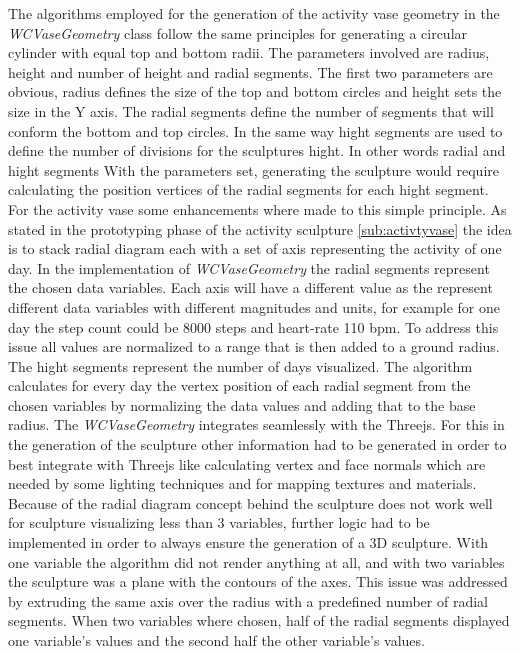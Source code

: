 \documentclass[../medieninformatik-arbeit.tex]{subfiles}
\begin{document}
The algorithms employed for the generation of the activity vase geometry in the \textit{WCVaseGeometry} class follow the same principles for generating a circular cylinder with equal top and bottom radii. The parameters involved are radius, height and number of height and radial segments. The first two parameters are obvious, radius defines the size of the top and bottom circles and height sets the size in the Y axis. The radial segments define the number of segments that will conform the bottom and top circles. In the same way hight segments are used to define the number of divisions for the sculptures hight. In other words radial and hight segments  With the parameters set, generating the sculpture would require calculating the position vertices of the radial segments for each hight segment. For the activity vase some enhancements where made to this simple principle. As stated in the prototyping phase of the activity sculpture \ref{sub:activtyvase} the idea is to stack radial diagram each with a set of axis representing the activity of one day. In the implementation of \textit{WCVaseGeometry} the radial segments represent the chosen data variables. Each axis will have a different value as the represent different data variables with different magnitudes and units, for example for one day the step count could be 8000 steps and heart-rate 110 bpm. To address this issue all values are normalized to a range that is then added to a ground radius. The hight segments represent the number of days visualized. The algorithm calculates for every day the vertex position of each radial segment from the chosen variables by normalizing the data values and adding that to the base radius. The \textit{WCVaseGeometry} integrates seamlessly with the Threejs. For this in the generation of the sculpture other information had to be generated in order to best integrate with Threejs like calculating vertex and face normals which are needed by some lighting techniques and for mapping textures and materials. Because of the radial diagram concept behind the sculpture does not work well for sculpture visualizing less than 3 variables, further logic had to be implemented in order to always ensure the generation of a 3D sculpture. With one variable the algorithm did not render anything at all, and with two variables the sculpture was a plane with the contours of the axes. This issue was addressed by extruding the same axis over the radius with a predefined number of radial segments. When two variables where chosen, half of the radial segments displayed one variable's values and the second half the other variable's values.  
\end{document}
